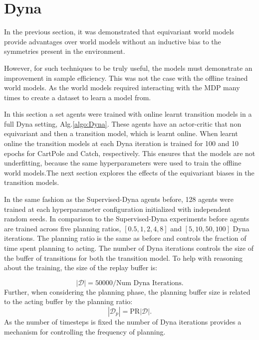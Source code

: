 \section{Dyna}\label{sec:Dyna_experiment}
In the previous section, it was demonstrated that equivariant world models provide advantages over world models without an inductive bias to the symmetries present in the environment.

However, for such techniques to be truly useful, the models must demonstrate an improvement in sample efficiency. This was not the case with the offline trained world models. As the world models required interacting with the MDP many times to create a dataset to learn a model from.

In this section a set agents were trained with online learnt transition models in a full Dyna setting, Alg.\ref{algo:Dyna}. These agents have an actor-critic that non equivariant and then a transition model, which is learnt online. When learnt online the transition models at each Dyna iteration is trained for 100 and 10 epochs for CartPole and Catch, respectively. This ensures that the models are not underfitting, because the same hyperparameters were used to train the offline world models.The next section explores the effects of the equivariant biases in the transition models.

In the same fashion as the Supervised-Dyna agents before, 128 agents were trained at each hyperparameter configuration initialized with independent random seeds. In comparison to the Supervised-Dyna experiments before agents are trained across five planning ratios, $[0.5, 1, 2, 4, 8]$ and $[5, 10, 50, 100]$ Dyna iterations. The planning ratio is the same as before and controls the fraction of time spent planning to acting. The number of Dyna iterations controls the size of the buffer of transitions for both the transition model. To help with reasoning about the training, the size of the replay buffer is:

\begin{equation}
	|\mathcal{D}| = 50000/\text{Num Dyna Iterations}.
\end{equation}
Further, when considering the planning phase, the planning buffer size is related to the acting buffer by the planning ratio:
\begin{equation}
	|\mathcal{D}_p| = \text{PR}|\mathcal{D}|.
\end{equation}
As the number of timesteps is fixed the number of Dyna iterations provides a mechanism for controlling the frequency of planning.
